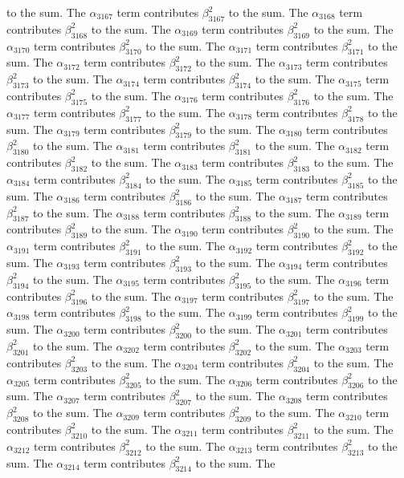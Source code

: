 \begin{lemma}
to the sum. The $\alpha_{3167}$ term contributes $\beta_{3167}^{2}$ to the sum. The $\alpha_{3168}$ term contributes $\beta_{3168}^{2}$ to the sum. The $\alpha_{3169}$ term contributes $\beta_{3169}^{2}$ to the sum. The $\alpha_{3170}$ term contributes $\beta_{3170}^{2}$ to the sum. The $\alpha_{3171}$ term contributes $\beta_{3171}^{2}$ to the sum. The $\alpha_{3172}$ term contributes $\beta_{3172}^{2}$ to the sum. The $\alpha_{3173}$ term contributes $\beta_{3173}^{2}$ to the sum. The $\alpha_{3174}$ term contributes $\beta_{3174}^{2}$ to the sum. The $\alpha_{3175}$ term contributes $\beta_{3175}^{2}$ to the sum. The $\alpha_{3176}$ term contributes $\beta_{3176}^{2}$ to the sum. The $\alpha_{3177}$ term contributes $\beta_{3177}^{2}$ to the sum. The $\alpha_{3178}$ term contributes $\beta_{3178}^{2}$ to the sum. The $\alpha_{3179}$ term contributes $\beta_{3179}^{2}$ to the sum. The $\alpha_{3180}$ term contributes $\beta_{3180}^{2}$ to the sum. The $\alpha_{3181}$ term contributes $\beta_{3181}^{2}$ to the sum. The $\alpha_{3182}$ term contributes $\beta_{3182}^{2}$ to the sum. The $\alpha_{3183}$ term contributes $\beta_{3183}^{2}$ to the sum. The $\alpha_{3184}$ term contributes $\beta_{3184}^{2}$ to the sum. The $\alpha_{3185}$ term contributes $\beta_{3185}^{2}$ to the sum. The $\alpha_{3186}$ term contributes $\beta_{3186}^{2}$ to the sum. The $\alpha_{3187}$ term contributes $\beta_{3187}^{2}$ to the sum. The $\alpha_{3188}$ term contributes $\beta_{3188}^{2}$ to the sum. The $\alpha_{3189}$ term contributes $\beta_{3189}^{2}$ to the sum. The $\alpha_{3190}$ term contributes $\beta_{3190}^{2}$ to the sum. The $\alpha_{3191}$ term contributes $\beta_{3191}^{2}$ to the sum. The $\alpha_{3192}$ term contributes $\beta_{3192}^{2}$ to the sum. The $\alpha_{3193}$ term contributes $\beta_{3193}^{2}$ to the sum. The $\alpha_{3194}$ term contributes $\beta_{3194}^{2}$ to the sum. The $\alpha_{3195}$ term contributes $\beta_{3195}^{2}$ to the sum. The $\alpha_{3196}$ term contributes $\beta_{3196}^{2}$ to the sum. The $\alpha_{3197}$ term contributes $\beta_{3197}^{2}$ to the sum. The $\alpha_{3198}$ term contributes $\beta_{3198}^{2}$ to the sum. The $\alpha_{3199}$ term contributes $\beta_{3199}^{2}$ to the sum. The $\alpha_{3200}$ term contributes $\beta_{3200}^{2}$ to the sum. The $\alpha_{3201}$ term contributes $\beta_{3201}^{2}$ to the sum. The $\alpha_{3202}$ term contributes $\beta_{3202}^{2}$ to the sum. The $\alpha_{3203}$ term contributes $\beta_{3203}^{2}$ to the sum. The $\alpha_{3204}$ term contributes $\beta_{3204}^{2}$ to the sum. The $\alpha_{3205}$ term contributes $\beta_{3205}^{2}$ to the sum. The $\alpha_{3206}$ term contributes $\beta_{3206}^{2}$ to the sum. The $\alpha_{3207}$ term contributes $\beta_{3207}^{2}$ to the sum. The $\alpha_{3208}$ term contributes $\beta_{3208}^{2}$ to the sum. The $\alpha_{3209}$ term contributes $\beta_{3209}^{2}$ to the sum. The $\alpha_{3210}$ term contributes $\beta_{3210}^{2}$ to the sum. The $\alpha_{3211}$ term contributes $\beta_{3211}^{2}$ to the sum. The $\alpha_{3212}$ term contributes $\beta_{3212}^{2}$ to the sum. The $\alpha_{3213}$ term contributes $\beta_{3213}^{2}$ to the sum. The $\alpha_{3214}$ term contributes $\beta_{3214}^{2}$ to the sum. The 
\end{lemma}
